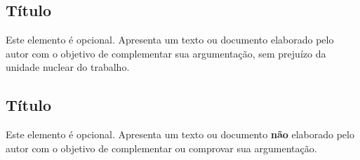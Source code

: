 \documentclass[
  oneside, %
  english,
  brazil
]{abntbibufjf}
\begin{document}
\begin{thebibliography}{99}




\end{thebibliography}



\begin{apendices}

  \chapter{\apendseq Título}

  Este elemento é opcional. Apresenta um texto ou documento elaborado pelo autor com o objetivo de complementar sua argumentação,
  sem prejuízo da unidade nuclear do trabalho.

\end{apendices}


\begin{anexos}

  \chapter{\anexoseq Título}

  Este elemento é opcional. Apresenta um texto ou documento \textbf{não} elaborado pelo autor com o objetivo de complementar ou comprovar sua
  argumentação.


\end{anexos}


\end{document}

